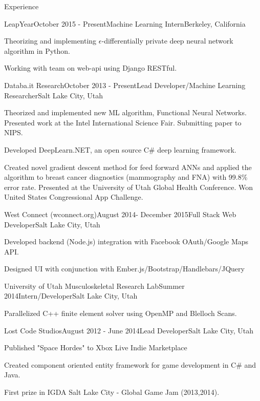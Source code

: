 \documentclass{resume} %
\begin{document}
\begin{rSection}{Experience}

\begin{rSubsection}{LeapYear}{October 2015 - Present}{Machine Learning Intern}{Berkeley, California}
\item Theorizing and implementing $\epsilon$-differentially private deep neural network algorithm in Python.
\item Working with team on web-api using Django RESTful.
\end{rSubsection}


\begin{rSubsection}{Databa.it Research}{October 2013 - Present}{Lead Developer/Machine Learning Researcher}{Salt Lake City, Utah}
\item Theorized and implemented new ML algorithm, Functional Neural Networks. Presented work at the Intel International Science Fair. Submitting paper to NIPS.
\item Developed DeepLearn.NET, an open source C\# deep learning framework.
\item Created novel gradient descent method for feed forward ANNs and applied the algorithm to breast cancer diagnostics (mammography and FNA) with 99.8\% error rate. Presented at the University of Utah Global Health Conference. Won United States Congressional App Challenge.  
\end{rSubsection}

\begin{rSubsection}{West Connect (wconnect.org)}{August 2014- December 2015}{Full Stack Web Developer}{Salt Lake City, Utah}
\item Developed backend (Node.js) integration with Facebook OAuth/Google Maps API.
\item Designed UI with conjunction with Ember.js/Bootstrap/Handlebars/JQuery
\end{rSubsection}

\begin{rSubsection}{University of Utah Musculoskeletal Research Lab}{Summer 2014}{Intern/Developer}{Salt Lake City, Utah}
\item Parallelized C++ finite element solver using OpenMP and Blelloch Scans.
\end{rSubsection}

\begin{rSubsection}{Lost Code Studios}{August 2012 - June 2014}{Lead Developer}{Salt Lake City, Utah}
\item Published "Space Hordes" to Xbox Live Indie Marketplace
\item Created component oriented entity framework for game development in C\# and Java.
\item First prize in IGDA Salt Lake City - Global Game Jam (2013,2014).
\end{rSubsection}





\end{rSection}
\end{document}

